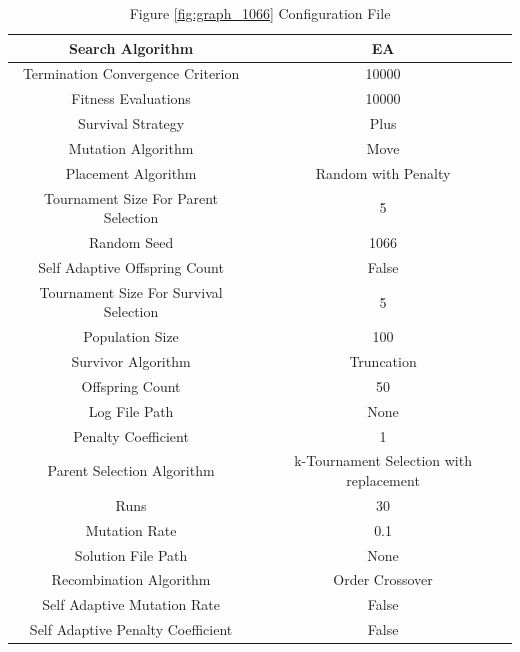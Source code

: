 \documentclass{standalone}
\begin{document}
\begin{table}[!htb]
	\centering
	\caption{Figure \ref{fig:graph_1066} Configuration File}
	\label{tab:graph_1066}
	\begin{tabular}{| c | c |}
		\hline
		Search Algorithm		& EA		 \\
		\hline
		Termination Convergence Criterion		& 10000		 \\
		\hline
		Fitness Evaluations		& 10000		 \\
		\hline
		Survival Strategy		& Plus		 \\
		\hline
		Mutation Algorithm		& Move		 \\
		\hline
		Placement Algorithm		& Random with Penalty		 \\
		\hline
		Tournament Size For Parent Selection		& 5		 \\
		\hline
		Random Seed		& 1066		 \\
		\hline
		Self Adaptive Offspring Count		& False		 \\
		\hline
		Tournament Size For Survival Selection		& 5		 \\
		\hline
		Population Size		& 100		 \\
		\hline
		Survivor Algorithm		& Truncation		 \\
		\hline
		Offspring Count		& 50		 \\
		\hline
		Log File Path		& None		 \\
		\hline
		Penalty Coefficient		& 1		 \\
		\hline
		Parent Selection Algorithm		& k-Tournament Selection with replacement		 \\
		\hline
		Runs		& 30		 \\
		\hline
		Mutation Rate		& 0.1		 \\
		\hline
		Solution File Path		& None		 \\
		\hline
		Recombination Algorithm		& Order Crossover		 \\
		\hline
		Self Adaptive Mutation Rate		& False		 \\
		\hline
		Self Adaptive Penalty Coefficient		& False		 \\
		\hline
	\end{tabular}
\end{table}
\end{document}
